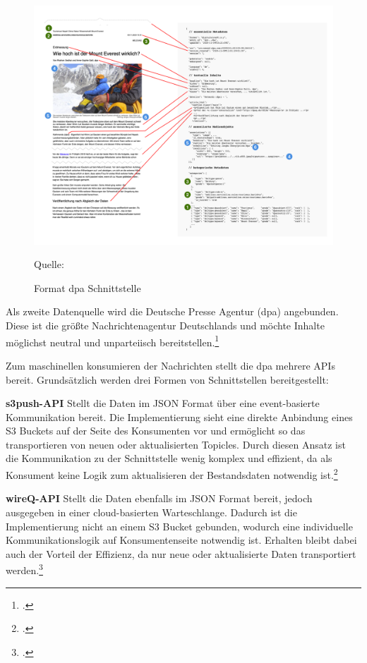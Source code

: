 \newpage
\begin{figure}
    \centering
    \includegraphics[width=1\linewidth]{abbildungen/dpa doc structure.png}
    \caption{Format dpa Schnittstelle}
    \label{fig:Format dpa Schnittstelle}
    Quelle: 
\end{figure}
Als zweite Datenquelle wird die Deutsche Presse Agentur (dpa) angebunden. 
Diese ist die größte Nachrichtenagentur Deutschlands und möchte Inhalte möglichst neutral und unparteiisch bereitstellen.\footcite[Vgl.][]{Dpa.about.2024}

Zum maschinellen konsumieren der Nachrichten stellt die dpa mehrere APIs bereit.
Grundsätzlich werden drei Formen von Schnittstellen bereitgestellt:

\textbf{s3push-API}
Stellt die Daten im JSON Format über eine event-basierte Kommunikation bereit. Die Implementierung sieht eine direkte Anbindung eines S3 Buckets auf der Seite des Konsumenten vor und ermöglicht so das transportieren von neuen oder aktualisierten Topicles. Durch diesen Ansatz ist die Kommunikation zu der Schnittstelle wenig komplex und effizient, da als Konsument keine Logik zum aktualisieren der Bestandsdaten notwendig ist.\footcite[Vgl.][]{DpaApiDocumentation.APIs.2024}

\textbf{wireQ-API}
Stellt die Daten ebenfalls im JSON Format bereit, jedoch ausgegeben in einer cloud-basierten Warteschlange. Dadurch ist die Implementierung nicht an einem S3 Bucket gebunden, wodurch eine individuelle Kommunikationslogik auf Konsumentenseite notwendig ist. Erhalten bleibt dabei auch der Vorteil der Effizienz, da nur neue oder aktualisierte Daten transportiert werden.\footcite[Vgl.][]{DpaApiDocumentation.APIs.2024}

